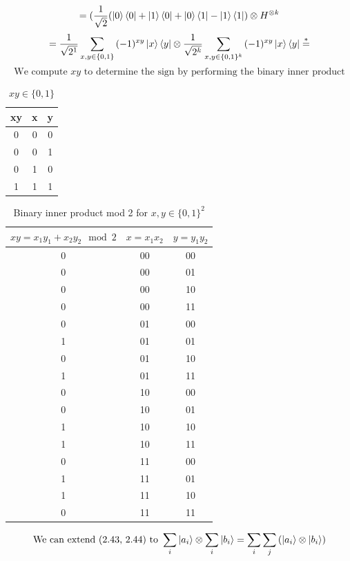 \documentclass{article}
\begin{document}
\begin{framed}
$$    $$
    $$
    = (\frac{1}{\sqrt{2}}(\ket{0}\bra{0} + \ket{1}\bra{0} + \ket{0}\bra{1} - \ket{1}\bra{1}) \otimes H^{\otimes k}
    $$
    $$
    = \frac{1}{\sqrt{2^1}}\sum_{x,y \in \{0, 1\}}{(-1)^{xy}\ket{x}\bra{y}} \otimes \frac{1}{\sqrt{2^k}}\sum_{x,y\in \{0,1\}^k}{(-1)^{xy}\ket{x}\bra{y}} \overset{*}{=}
    $$
    $$
    \text{We compute } xy \text{ to determine the sign by performing the binary inner product} 
    $$
\begin{table}[H] 
    \centering
    \begin{tabular}{|c|c|c|}
        \hline
        xy & x & y \\ 
        \hline
        0 & 0 & 0 \\
        0 & 0 & 1 \\
        0 & 1 & 0 \\
        1 & 1 & 1 \\
        \hline
    \end{tabular}
    \caption{$xy \in \{0,1\}$}
    \label{tab:binary_inner_product}
\end{table}
\begin{table}[H] 
    \centering
    \begin{tabular}{|c|c|c|}
        \hline
        $xy = x_1y_1 + x_2y_2 \mod 2$ & $x=x_1x_2$ & $y=y_1y_2$ \\ 
        \hline
        0 & 00 & 00 \\ 0 & 00 & 01 \\ 0 & 00 & 10 \\ 0 & 00 & 11 \\ 
        0 & 01 & 00 \\ 1 & 01 & 01 \\ 0 & 01 & 10 \\ 1 & 01 & 11 \\ 
        0 & 10 & 00 \\ 0 & 10 & 01 \\ 1 & 10 & 10 \\ 1 & 10 & 11 \\ 
        0 & 11 & 00 \\ 1 & 11 & 01 \\ 1 & 11 & 10 \\ 0 & 11 & 11 \\ 
        \hline
    \end{tabular}
    \caption{Binary inner product mod 2 for $x, y \in \{0,1\}^2$}
    \label{tab:binary_inner_product}
\end{table}
    \begin{equation}
        \text{We can extend (2.43, 2.44) to } \sum_{i}{\ket{a_i}} \otimes \sum_{i}{\ket{b_i}} = \sum_{i}\sum_{j}{(\ket{a_i} \otimes \ket{b_i})}

\end{equation}
\end{framed}
\end{document}
